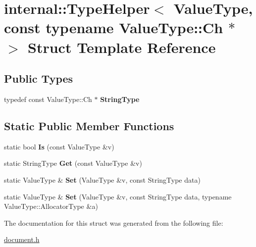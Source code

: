 \hypertarget{a00312}{}\section{internal\+:\+:Type\+Helper$<$ Value\+Type, const typename Value\+Type\+:\+:Ch $\ast$ $>$ Struct Template Reference}
\label{a00312}
\subsection*{Public Types}
\begin{DoxyCompactItemize}
\item 
typedef const Value\+Type\+::\+Ch $\ast$ {\bfseries String\+Type}\hypertarget{a00312_a61b7fd9c92eab60394fdff466251c399}{}\label{a00312_a61b7fd9c92eab60394fdff466251c399}

\end{DoxyCompactItemize}
\subsection*{Static Public Member Functions}
\begin{DoxyCompactItemize}
\item 
static bool {\bfseries Is} (const Value\+Type \&v)\hypertarget{a00312_a9543f180b6ac2b923486f1b69d5356ea}{}\label{a00312_a9543f180b6ac2b923486f1b69d5356ea}

\item 
static String\+Type {\bfseries Get} (const Value\+Type \&v)\hypertarget{a00312_a11f8ddfbc91f1d890d63cc67e3f1abb6}{}\label{a00312_a11f8ddfbc91f1d890d63cc67e3f1abb6}

\item 
static Value\+Type \& {\bfseries Set} (Value\+Type \&v, const String\+Type data)\hypertarget{a00312_af3a44a3b6f485a71a73af69d30668c8f}{}\label{a00312_af3a44a3b6f485a71a73af69d30668c8f}

\item 
static Value\+Type \& {\bfseries Set} (Value\+Type \&v, const String\+Type data, typename Value\+Type\+::\+Allocator\+Type \&a)\hypertarget{a00312_a8588f2ab1d0ffbb4c1810d60a500a8c5}{}\label{a00312_a8588f2ab1d0ffbb4c1810d60a500a8c5}

\end{DoxyCompactItemize}


The documentation for this struct was generated from the following file\+:\begin{DoxyCompactItemize}
\item 
\hyperlink{a00473}{document.\+h}\end{DoxyCompactItemize}
